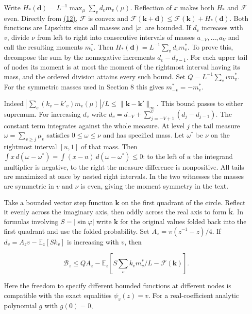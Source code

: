 \documentclass[11pt,a4paper]{article}
\begin{document}
Write \(H_*(\mathbf d)=L^{-1}\max_\mu\sum_v d_v m_v(\mu)\). Reflection of \(x\) makes both \(H_*\) and \(\mathcal F\) even. Directly from \hyperref[eq:12]{(12)}, \(\mathcal F\) is convex and \(\mathcal F(\mathbf k+\mathbf d)\le\mathcal F(\mathbf k)+H_*(\mathbf d)\). Both functions are Lipschitz since all masses and \(|x|\) are bounded. If \(d_v\) increases with \(v\), divide \(\nu\) from left to right into consecutive intervals of masses \(a_{-V},\ldots,a_V\) and call the resulting moments \(m_v^*\). Then \(H_*(\mathbf d)=L^{-1}\sum_v d_vm_v^*\). To prove this, decompose the sum by the nonnegative increments \(d_v-d_{v-1}\). For each upper tail of nodes its moment is at most the moment of the rightmost interval having its mass, and the ordered division attains every such bound. Set \(Q=L^{-1}\sum_v v m_v^*\). For the symmetric masses used in Section 8 this gives \(m_{-v}^*=-m_v^*\).

Indeed \(|\sum_v (k_v-k'_v)m_v(\mu)|/L\le\|\mathbf k-\mathbf k'\|_\infty\). This bound passes to either supremum. For increasing \(d_v\) write \(d_v=d_{-V}+\sum_{j=-V+1}^v(d_j-d_{j-1})\). The constant term integrates against the whole measure. At level \(j\) the tail measure \(\omega=\sum_{v\ge j}\mu_v\) satisfies \(0\le\omega\le\nu\) and has specified mass. Let \(\omega^*\) be \(\nu\) on the rightmost interval \([u,1]\) of that mass. Then \(\int x\,d(\omega-\omega^*)=\int(x-u)\,d(\omega-\omega^*)\le0\): to the left of \(u\) the integrand multiplier is negative, to the right the measure difference is nonpositive. All tails are maximized at once by nested right intervals. In the two witnesses the masses are symmetric in \(v\) and \(\nu\) is even, giving the moment symmetry in the text.

Take a bounded vector step function \(\mathbf k\) on the first quadrant of the circle. Reflect it evenly across the imaginary axis, then oddly across the real axis to form \(\widetilde{\mathbf k}\). In formulas involving \(S=|\sin\varphi|\) write \(\mathbf k\) for the original values folded back into the first quadrant and use the folded probability. Set \(A_z=\pi(z^{-1}-z)/4\). If \(d_v=A_z v-\mathbb E_z[Sk_v]\) is increasing with \(v\), then

\[
 \mathcal B_z\le Q A_z-
 \mathbb E_z\left[S\sum_v k_v m_v^*/L-\mathcal F(\mathbf k)\right].       \tag{19}\label{eq:19}
\]

Here the freedom to specify different bounded functions at different nodes is compatible with the exact equalities \(\psi_v(z)=v\). For a real-coefficient analytic polynomial \(g\) with \(g(0)=0\),
\end{document}
